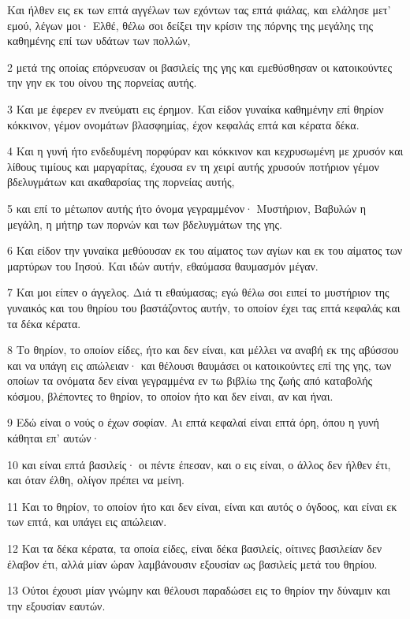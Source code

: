 \par Και ήλθεν εις εκ των επτά αγγέλων των εχόντων τας επτά φιάλας, και ελάλησε μετ' εμού, λέγων μοι· Ελθέ, θέλω σοι δείξει την κρίσιν της πόρνης της μεγάλης της καθημένης επί των υδάτων των πολλών,
\par 2 μετά της οποίας επόρνευσαν οι βασιλείς της γης και εμεθύσθησαν οι κατοικούντες την γην εκ του οίνου της πορνείας αυτής.
\par 3 Και με έφερεν εν πνεύματι εις έρημον. Και είδον γυναίκα καθημένην επί θηρίον κόκκινον, γέμον ονομάτων βλασφημίας, έχον κεφαλάς επτά και κέρατα δέκα.
\par 4 Και η γυνή ήτο ενδεδυμένη πορφύραν και κόκκινον και κεχρυσωμένη με χρυσόν και λίθους τιμίους και μαργαρίτας, έχουσα εν τη χειρί αυτής χρυσούν ποτήριον γέμον βδελυγμάτων και ακαθαρσίας της πορνείας αυτής,
\par 5 και επί το μέτωπον αυτής ήτο όνομα γεγραμμένον· Μυστήριον, Βαβυλών η μεγάλη, η μήτηρ των πορνών και των βδελυγμάτων της γης.
\par 6 Και είδον την γυναίκα μεθύουσαν εκ του αίματος των αγίων και εκ του αίματος των μαρτύρων του Ιησού. Και ιδών αυτήν, εθαύμασα θαυμασμόν μέγαν.
\par 7 Και μοι είπεν ο άγγελος. Διά τι εθαύμασας; εγώ θέλω σοι ειπεί το μυστήριον της γυναικός και του θηρίου του βαστάζοντος αυτήν, το οποίον έχει τας επτά κεφαλάς και τα δέκα κέρατα.
\par 8 Το θηρίον, το οποίον είδες, ήτο και δεν είναι, και μέλλει να αναβή εκ της αβύσσου και να υπάγη εις απώλειαν· και θέλουσι θαυμάσει οι κατοικούντες επί της γης, των οποίων τα ονόματα δεν είναι γεγραμμένα εν τω βιβλίω της ζωής από καταβολής κόσμου, βλέποντες το θηρίον, το οποίον ήτο και δεν είναι, αν και ήναι.
\par 9 Εδώ είναι ο νούς ο έχων σοφίαν. Αι επτά κεφαλαί είναι επτά όρη, όπου η γυνή κάθηται επ' αυτών·
\par 10 και είναι επτά βασιλείς· οι πέντε έπεσαν, και ο εις είναι, ο άλλος δεν ήλθεν έτι, και όταν έλθη, ολίγον πρέπει να μείνη.
\par 11 Και το θηρίον, το οποίον ήτο και δεν είναι, είναι και αυτός ο όγδοος, και είναι εκ των επτά, και υπάγει εις απώλειαν.
\par 12 Και τα δέκα κέρατα, τα οποία είδες, είναι δέκα βασιλείς, οίτινες βασιλείαν δεν έλαβον έτι, αλλά μίαν ώραν λαμβάνουσιν εξουσίαν ως βασιλείς μετά του θηρίου.
\par 13 Ούτοι έχουσι μίαν γνώμην και θέλουσι παραδώσει εις το θηρίον την δύναμιν και την εξουσίαν εαυτών.
